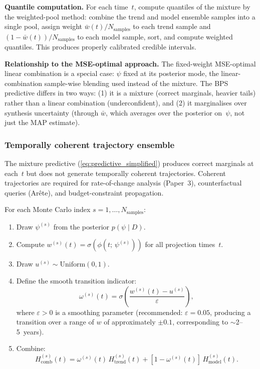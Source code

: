 \documentclass[11pt]{article}
\begin{document}
\textbf{Quantile computation.}  For each time~$t$, compute quantiles of the mixture by the weighted-pool method: combine the trend and model ensemble samples into a single pool, assign weight $\bar{w}(t) / N_{\mathrm{samples}}$ to each trend sample and $(1 - \bar{w}(t)) / N_{\mathrm{samples}}$ to each model sample, sort, and compute weighted quantiles.  This produces properly calibrated credible intervals.

\textbf{Relationship to the MSE-optimal approach.}  The fixed-weight MSE-optimal linear combination is a special case: $\psi$ fixed at its posterior mode, the linear-combination sample-wise blending used instead of the mixture.  The BPS predictive differs in two ways: (1) it is a mixture (correct marginals, heavier tails) rather than a linear combination (underconfident), and (2) it marginalises over synthesis uncertainty (through $\bar{w}$, which averages over the posterior on~$\psi$, not just the MAP estimate).


\subsubsection{Temporally coherent trajectory ensemble}
\label{sec:coherent_trajectories}

The mixture predictive (\cref{eq:predictive_simplified}) produces correct marginals at each~$t$ but does not generate temporally coherent trajectories.  Coherent trajectories are required for rate-of-change analysis (Paper~3), counterfactual queries (Ar\^ete), and budget-constraint propagation.

For each Monte Carlo index $s = 1, \ldots, N_{\mathrm{samples}}$:
\begin{enumerate}
  \item Draw $\psi^{(s)}$ from the posterior $p(\psi \mid D)$.
  \item Compute $w^{(s)}(t) = \sigma(\phi(t;\,\psi^{(s)}))$ for all projection times~$t$.
  \item Draw $u^{(s)} \sim \mathrm{Uniform}(0, 1)$.
  \item Define the smooth transition indicator:
  \begin{equation}
    \omega^{(s)}(t) = \sigma\!\left(\frac{w^{(s)}(t) - u^{(s)}}{\varepsilon}\right),
    \label{eq:smooth_transition}
  \end{equation}
  where $\varepsilon > 0$ is a smoothing parameter (recommended: $\varepsilon = 0.05$, producing a transition over a range of $w$ of approximately $\pm 0.1$, corresponding to $\sim$2--5~years).
  \item Combine:
  \begin{equation}
    H_{\mathrm{comb}}^{(s)}(t) = \omega^{(s)}(t)\,H_{\mathrm{trend}}^{(s)}(t) + [1 - \omega^{(s)}(t)]\,H_{\mathrm{model}}^{(s)}(t).
    \label{eq:trajectory_combination}
  \end{equation}
\end{enumerate}
\end{document}

